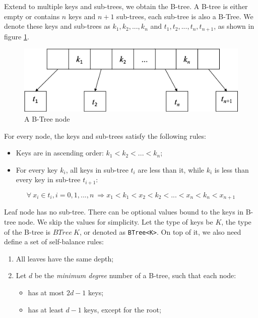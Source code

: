\documentclass[b5paper]{article}
\begin{document}
Extend to multiple keys and sub-trees, we obtain the B-tree. A B-tree is either empty or contains $n$ keys and $n + 1$ sub-trees, each sub-tree is also a B-Tree. We denote these keys and sub-trees as $k_1, k_2, ..., k_n$ and $t_1, t_2, ..., t_n, t_{n+1}$, as shown in figure \ref{fig:btree-node}.

\begin{figure}[htbp]
  \centering
  \includegraphics[scale=0.5]{img/btree-node.png}
  \caption{A B-Tree node}
  \label{fig:btree-node}
\end{figure}

For every node, the keys and sub-trees satisfy the following rules:

\begin{itemize}
\item Keys are in ascending order: $k_1 < k_2 < ... < k_n$;
\item For every key $k_i$, all keys in sub-tree $t_i$ are less than it, while $k_i$ is less than every key in sub-tree $t_{i+1}$:
\end{itemize}

\begin{equation}
\forall\ x_i \in t_i, i=0, 1, ..., n\ \Rightarrow x_1 < k_1 < x_2 < k_2 < ... < x_n < k_n < x_{n+1}
\label{eq:btree-order}
\end{equation}

Leaf node has no sub-tree. There can be optional values bound to the keys in B-tree node. We skip the values for simplicity. Let the type of keys be $K$, the type of the B-tree is $BTree\ K$, or denoted as \texttt{BTree<K>}. On top of it, we also need define a set of self-balance rules:

\begin{enumerate}
\item All leaves have the same depth;
\item Let $d$ be the {\em minimum degree} number of a B-tree, such that each node:
  \begin{itemize}
  \item has at most $2d - 1$ keys;
  \item has at least $d - 1$ keys, except for the root;
  \end{itemize}
\end{enumerate}
\end{document}

